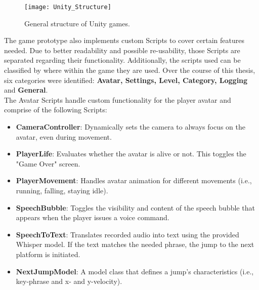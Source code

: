 \documentclass[draft,final]{vutinfth} %
\begin{document}
\begin{figure}
  \centering
  \texttt{[image: Unity\_Structure]}
  \caption{General structure of Unity games.}
\end{figure}
The game prototype also implements custom Scripts to cover certain features needed. Due to better readability and possible re-usability, those Scripts are separated regarding their functionality. Additionally, the scripts used can be classified by where within the game they are used. Over the course of this thesis, six categories were identified: \textbf{Avatar, Settings, Level, Category, Logging } and \textbf{General}. \\

The Avatar Scripts handle custom functionality for the player avatar and comprise of the following Scripts:
\begin{itemize}
\item \textbf{CameraController}: Dynamically sets the camera to always focus on the avatar, even during movement.
\item \textbf{PlayerLife}: Evaluates whether the avatar is alive or not. This toggles the "Game Over" screen.
\item \textbf{PlayerMovement}: Handles avatar animation for different movements (i.e., running, falling, staying idle).
\item \textbf{SpeechBubble}: Toggles the visibility and content of the speech bubble that appears when the player issues a voice command.
\item \textbf{SpeechToText}: Translates recorded audio into text using the provided Whisper model. If the text matches the needed phrase, the jump to the next platform is initiated.
\item \textbf{NextJumpModel}: A model class that defines a jump's characteristics (i.e., key-phrase and x- and y-velocity).
\end{itemize}
\end{document}
